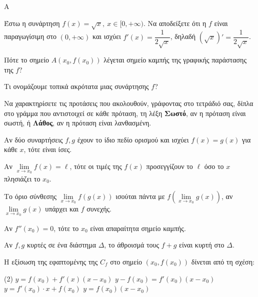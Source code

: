 \begin{thema}{A}
\begin{erwthma}
    \item Έστω η συνάρτηση $ f(x)=\sqrt{x},\ x\in[0,+\infty) $. Να αποδείξετε ότι η $ f $ είναι παραγωγίσιμη στο $ (0,+\infty) $ και ισχύει $ f'(x)=\dfrac{1}{2\sqrt{x}} $, δηλαδή $ \left(\sqrt{x}\right)'=\dfrac{1}{2\sqrt{x}} $.
    \item Πότε το σημείο $A(x_0, f(x_0))$ λέγεται σημείο καμπής της γραφικής παράστασης της $f$?
    \item Τι ονομάζουμε τοπικά ακρότατα μιας συνάρτησης $f$?
    \item Να χαρακτηρίσετε τις προτάσεις που ακολουθούν, γράφοντας στο τετράδιό σας, δίπλα στο γράμμα που αντιστοιχεί σε κάθε πρόταση, τη λέξη \textbf{Σωστό}, αν η πρόταση είναι σωστή, ή \textbf{Λάθος}, αν η πρόταση είναι λανθασμένη.
    \begin{alist}
        \item Αν δύο συναρτήσεις $f, g$ έχουν το ίδιο πεδίο ορισμού και ισχύει $f(x)=g(x)$ για κάθε $x$, τότε είναι ίσες.
        \item Αν $\lim\limits_{x\to x_0} f(x) = \ell$, τότε οι τιμές της $f(x)$ προσεγγίζουν το $\ell$ όσο το $x$ πλησιάζει το $x_0$.
        \item Το όριο σύνθεσης $\lim\limits_{x\to x_0} f(g(x))$ ισούται πάντα με $f(\lim\limits_{x\to x_0} g(x))$, αν $\lim\limits_{x\to x_0} g(x)$ υπάρχει και $f$ συνεχής.
        \item Αν $f''(x_0) = 0$, τότε το $x_0$ είναι απαραίτητα σημείο καμπής.
        \item Αν $f, g$ κυρτές σε ένα διάστημα $\varDelta$, το άθροισμά τους $f+g$ είναι κυρτή στο $\varDelta$.
    \end{alist}
    \item Η εξίσωση της εφαπτομένης της $C_f$ στο σημείο $(x_0, f(x_0))$ δίνεται από τη σχέση:
    \begin{tasks}[label=\let\textdexiakeraia\relax\alph*.](2)
        \task $y = f(x_0) + f'(x)(x - x_0)$
        \task $y - f(x_0) = f'(x_0)(x - x_0)$
        \task $y = f'(x_0) \cdot x + f(x_0)$
        \task $y = f(x_0)(x - x_0)$
    \end{tasks}
\end{erwthma}
\end{thema}


